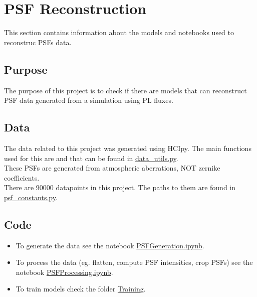 \section{PSF Reconstruction}
	This section contains information about the models and notebooks used to reconstruc PSFs data.

	
	\subsection{Purpose}
	
		The purpose of this project is to check if there are models that can reconstruct PSF data generated from a simulation using PL fluxes.
		
		
	\subsection{Data}
	
		The data related to this project was generated using HCIpy. The main functions used for this are  and  that can be found in \href{https://github.com/Dacarpe03/PLImageReconstruction/blob/main/Utils/data_utils.py}{data\_utils.py}.\\
		
		These PSFs are generated from atmospheric aberrations, NOT zernike coefficients.\\
		
		There are 90000 datapoints in this project. The paths to them are found in \href{https://github.com/Dacarpe03/PLImageReconstruction/blob/main/Utils/psf_constants.py}{psf\_constants.py}.\\
	
	
	\subsection{Code}

		\begin{itemize}
			\item To generate the data see the notebook \href{https://github.com/Dacarpe03/PLImageReconstruction/blob/main/PSFReconstruction/DataNotebooks/PSFGeneration.ipynb}{PSFGeneration.ipynb}.
			\item To process the data (eg. flatten, compute PSF intensities, crop PSFs) see the notebook \href{https://github.com/Dacarpe03/PLImageReconstruction/blob/main/PSFReconstruction/DataNotebooks/PSFProcessing.ipynb}{PSFProcessing.ipynb}.
			\item To train models check the folder \href{https://github.com/Dacarpe03/PLImageReconstruction/tree/main/PSFReconstruction/Training}{Training}.
			
		\end{itemize}


